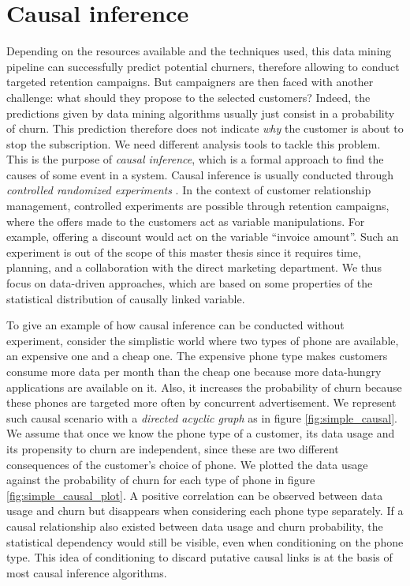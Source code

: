 \section{Causal inference}

Depending on the resources available and the techniques used, this data mining
pipeline can successfully predict potential churners, therefore allowing to
conduct targeted retention campaigns. But campaigners are then faced with
another challenge: what should they propose to the selected customers? Indeed,
the predictions given by data mining algorithms usually just consist in a
probability of churn. This prediction therefore does not indicate \emph{why} the
customer is about to stop the subscription. We need different analysis tools to
tackle this problem. This is the purpose of \emph{causal inference}, which is a
formal approach to find the causes of some event in a system. Causal inference
is usually conducted through \emph{controlled randomized experiments}
\parencite{fisher1937design}. In the context of customer relationship
management, controlled experiments are possible through retention campaigns,
where the offers made to the customers act as variable manipulations. For
example, offering a discount would act on the variable ``invoice amount''. Such
an experiment is out of the scope of this master thesis since it requires time,
planning, and a collaboration with the direct marketing department. We thus
focus on data-driven approaches, which are based on some properties of the
statistical distribution of causally linked variable.

To give an example of how causal inference can be conducted without experiment,
consider the simplistic world where two types of phone are available, an
expensive one and a cheap one. The expensive phone type makes customers consume
more data per month than the cheap one because more data-hungry applications are
available on it. Also, it increases the probability of churn because these
phones are targeted more often by concurrent advertisement. We represent such
causal scenario with a \emph{directed acyclic graph} as in figure
\ref{fig:simple_causal}. We assume that once we know the phone type of a
customer, its data usage and its propensity to churn are independent, since
these are two different consequences of the customer's choice of phone. We
plotted the data usage against the probability of churn for each type of phone in
figure \ref{fig:simple_causal_plot}. A positive correlation can be observed
between data usage and churn but disappears when considering each phone type
separately. If a causal relationship also existed between data usage and churn
probability, the statistical dependency would still be visible, even when
conditioning on the phone type. This idea of conditioning to discard putative
causal links is at the basis of most causal inference algorithms.

